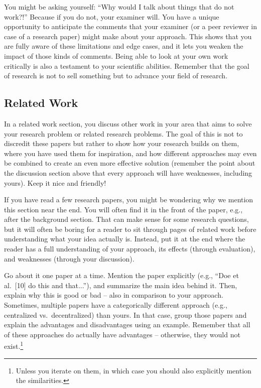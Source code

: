 \documentclass[a4]{article}
\begin{document}
You might be asking yourself:
``Why would I talk about things that do not work?!''
Because if you do not, your examiner will.
You have a unique opportunity to anticipate the comments that your examiner (or a peer reviewer in case of a research paper) might make about your approach.
This shows that you are fully aware of these limitations and edge cases, and it lets you weaken the impact of those kinds of comments.
Being able to look at your own work critically is also a testament to your scientific abilities.
Remember that the goal of research is not to sell something but to advance your field of research.

\subsection{Related Work}
\label{subsec:relatedwork}

In a related work section, you discuss other work in your area that aims to solve your research problem or related research problems.
The goal of this is not to discredit these papers but rather to show how your research builds on them, where you have used them for inspiration, and how different approaches may even be combined to create an even more effective solution (remember the point about the discussion section above that every approach will have weaknesses, including yours).
Keep it nice and friendly!

If you have read a few research papers, you might be wondering why we mention this section near the end.
You will often find it in the front of the paper, e.g., after the background section.
That can make sense for some research questions, but it will often be boring for a reader to sit through pages of related work before understanding what your idea actually is.
Instead, put it at the end where the reader has a full understanding of your approach, its effects (through evaluation), and weaknesses (through your discussion).

Go about it one paper at a time.
Mention the paper explicitly (e.g., ``Doe et al.~[10] do this and that...''), and summarize the main idea behind it.
Then, explain why this is good or bad -- also in comparison to your approach.
Sometimes, multiple papers have a categorically different approach (e.g., centralized vs.~decentralized) than yours.
In that case, group those papers and explain the advantages and disadvantages using an example.
Remember that all of these approaches do actually have advantages -- otherwise, they would not exist.\footnote{Unless you iterate on them, in which case you should also explicitly mention the similarities.}
\end{document}
